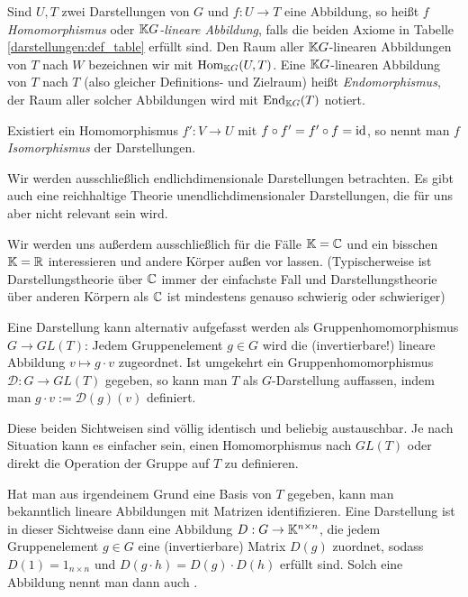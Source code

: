 \begin{definition}[Darstellungen]
Sind $U,T$ zwei Darstellungen von $G$ und $f: U\to T$ eine Abbildung, so heißt $f$ \emph{Homomorphismus} oder \emph{$\mathbb{K} G$-lineare Abbildung}, falls die beiden Axiome in Tabelle \ref{darstellungen:def_table} erfüllt sind. Den Raum aller $\mathbb{K} G$-linearen Abbildungen von $T$ nach $W$ bezeichnen wir mit $\operatorname{Hom}_{\mathbb{K} G}(U,T)$. Eine $\mathbb{K} G$-linearen Abbildung von $T$ nach $T$ (also gleicher Definitions- und Zielraum) heißt \emph{Endomorphismus}, der Raum aller solcher Abbildungen wird mit $\operatorname{End}_{\mathbb{K} G}(T)$ notiert.

Existiert ein Homomorphismus $f': V\to U$ mit $f\circ f'=f'\circ f=\operatorname{id}$, so nennt man $f$ \emph{Isomorphismus} der Darstellungen.
\end{definition}

\begin{convention}
Wir werden ausschließlich endlichdimensionale Darstellungen betrachten. Es gibt auch eine reichhaltige Theorie unendlichdimensionaler Darstellungen, die für uns aber nicht relevant sein wird.

Wir werden uns außerdem ausschließlich für die Fälle $\mathbb{K}=\mathbb{C}$ und ein bisschen $\mathbb{K}=\mathbb{R}$ interessieren und andere Körper außen vor lassen. (Typischerweise ist Darstellungstheorie über $\mathbb{C}$ immer der einfachste Fall und Darstellungstheorie über anderen Körpern als $\mathbb{C}$ ist mindestens genauso schwierig oder schwieriger)
\end{convention}

\begin{remark}
Eine Darstellung kann alternativ aufgefasst werden als Gruppenhomomorphismus $G\to GL(T)$: Jedem Gruppenelement $g\in G$ wird die (invertierbare!) lineare Abbildung $v\mapsto g\cdot v$ zugeordnet. Ist umgekehrt ein Gruppenhomomorphismus $\mathcal{D}: G\to GL(T)$ gegeben, so kann man $T$ als $G$-Darstellung auffassen, indem man $g\cdot v:=\mathcal{D}(g)(v)$ definiert.

Diese beiden Sichtweisen sind völlig identisch und beliebig austauschbar. Je nach Situation kann es einfacher sein, einen Homomorphismus nach $GL(T)$ oder direkt die Operation der Gruppe auf $T$ zu definieren.

\medbreak
Hat man aus irgendeinem Grund eine Basis von $T$ gegeben, kann man bekanntlich lineare Abbildungen mit Matrizen identifizieren. Eine Darstellung ist in dieser Sichtweise dann eine Abbildung ${D}: G\to \mathbb{K}^{n\times n}$, die jedem Gruppenelement $g\in G$ eine (invertierbare) Matrix $D(g)$ zuordnet, sodass $D(1)=1_{n\times n}$ und $D(g\cdot h)=D(g)\cdot D(h)$ erfüllt sind. Solch eine Abbildung nennt man dann auch .
\end{remark}

